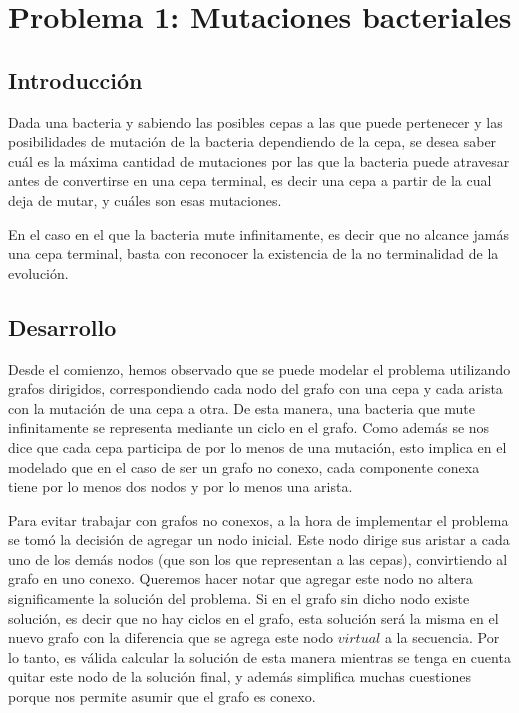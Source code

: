 \section{Problema 1: Mutaciones bacteriales}
 
\subsection{Introducci\'on}

\quad Dada una bacteria y sabiendo las posibles cepas a las que puede pertenecer y las posibilidades de mutación de la bacteria dependiendo de la cepa, se desea saber cuál es la máxima cantidad de mutaciones por las que la bacteria puede atravesar antes de convertirse en una cepa terminal, es decir una cepa a partir de la cual deja de mutar, y cuáles son esas mutaciones.

\quad En el caso en el que la bacteria mute infinitamente, es decir que no alcance jamás una cepa terminal, basta con reconocer la existencia de la no terminalidad de la evolución.
 
\subsection{Desarrollo}
 
\quad Desde el comienzo, hemos observado que se puede modelar el problema utilizando grafos dirigidos, correspondiendo cada nodo del grafo con una cepa y cada arista con la mutación de una cepa a otra. De esta manera, una bacteria que mute infinitamente se representa mediante un ciclo en el grafo. Como además se nos dice que cada cepa participa de por lo menos de una mutación, esto implica en el modelado que en el caso de ser un grafo no conexo, cada componente conexa tiene por lo menos dos nodos y por lo menos una arista.

\quad Para evitar trabajar con grafos no conexos, a la hora de implementar el problema se tomó la decisión de agregar un nodo inicial. Este nodo dirige sus aristar a cada uno de los demás nodos (que son los que representan a las cepas), convirtiendo al grafo en uno conexo. Queremos hacer notar que agregar este nodo no altera significamente la solución del problema. Si en el grafo sin dicho nodo existe solución, es decir que no hay ciclos en el grafo, esta solución será la misma en el nuevo grafo con la diferencia que se agrega este nodo $virtual$ a la secuencia. Por lo tanto, es válida calcular la solución de esta manera mientras se tenga en cuenta quitar este nodo de la solución final, y además simplifica muchas cuestiones porque nos permite asumir que el grafo es conexo.

